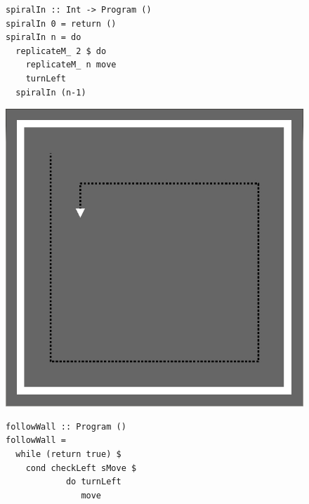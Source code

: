 \FloatBarrier

\begin{figure}
\begin{minipage}[]{0.50\linewidth}
\begin{small}
\begin{verbatim}
spiralIn :: Int -> Program () 
spiralIn 0 = return () 
spiralIn n = do
  replicateM_ 2 $ do
    replicateM_ n move
    turnLeft
  spiralIn (n-1) 
\end{verbatim}
\end{small}
\end{minipage}
\hspace{0.05\linewidth} 
\begin{minipage}[]{0.45\linewidth}
\includegraphics[width=\linewidth]{./bb/spiral1}
\end{minipage}
\begin{minipage}[]{0.50\linewidth}
\begin{small}
\begin{verbatim} 
followWall :: Program () 
followWall = 
  while (return true) $ 
    cond checkLeft sMove $ 
            do turnLeft
               move 


\end{verbatim}
\end{small}
\end{minipage}
\end{figure}
